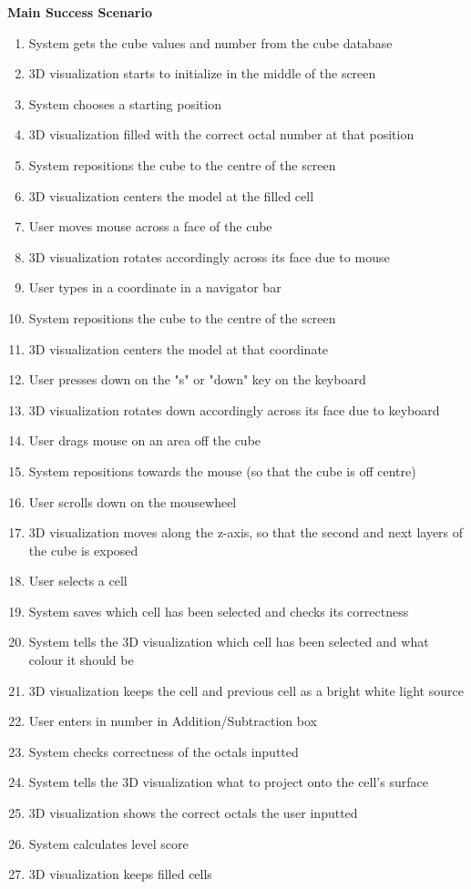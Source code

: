 \documentclass[12pt]{article}
\begin{document}
\textbf{Main Success Scenario}
\begin{enumerate}
\item System gets the cube values and number from the cube database
\item 3D visualization starts to initialize in the middle of the screen
\item System chooses a starting position
\item 3D visualization filled with the correct octal number at that position
\item System repositions the cube to the centre of the screen
\item 3D visualization centers the model at the filled cell
\item User moves mouse across a face of the cube
\item 3D visualization rotates accordingly across its face due to mouse
\item User types in a coordinate in a navigator bar
\item System repositions the cube to the centre of the screen
\item 3D visualization centers the model at that coordinate
\item User presses down on the "s" or "down" key on the keyboard
\item 3D visualization rotates down accordingly across its face due to keyboard
\item User drags mouse on an area off the cube
\item System repositions towards the mouse (so that the cube is off centre)
\item User scrolls down on the mousewheel
\item 3D visualization moves along the z-axis, so that the second and next layers of the cube is exposed
\item User selects a cell
\item System saves which cell has been selected and checks its correctness
\item System tells the 3D visualization which cell has been selected and what colour it should be
\item 3D visualization keeps the cell and previous cell as a bright white light source
\item User enters in number in Addition/Subtraction box
\item System checks correctness of the octals inputted
\item System tells the 3D visualization what to project onto the cell's surface 
\item 3D visualization shows the correct octals the user inputted
\item System calculates level score
\item 3D visualization keeps filled cells
\end{enumerate}
\end{document}
